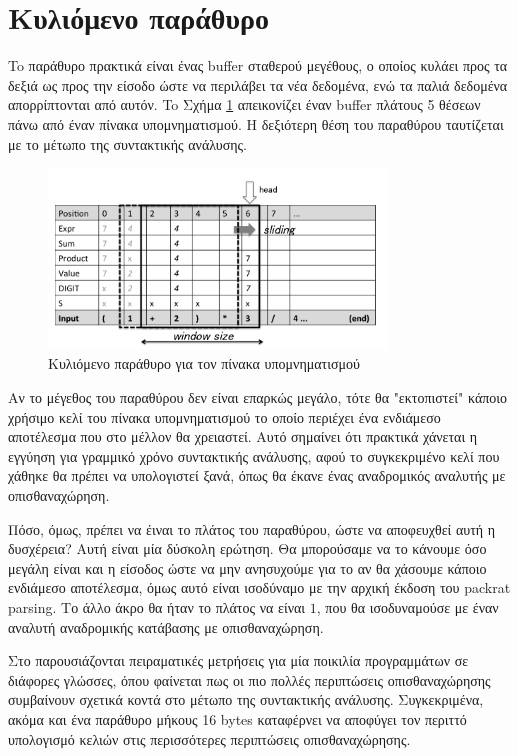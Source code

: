 \section{Κυλιόμενο παράθυρο}

To παράθυρο πρακτικά είναι ένας buffer σταθερού μεγέθους, ο οποίος κυλάει προς τα δεξιά ως προς την είσοδο ώστε να περιλάβει τα νέα δεδομένα, ενώ τα παλιά δεδομένα απορρίπτονται από αυτόν. 
To Σχήμα \ref{fig:slide_window} απεικονίζει έναν buffer πλάτους 5 θέσεων πάνω από έναν πίνακα υπομνηματισμού.
Η δεξιότερη θέση του παραθύρου ταυτίζεται με το μέτωπο της συντακτικής ανάλυσης.

\begin{figure}[h]
	\centering
	\includegraphics[width=0.8\textwidth]{pics/slide_window} 
	\caption{Κυλιόμενο παράθυρο για τον πίνακα υπομνηματισμού \cite{Kuramitsu2015a}}
	\label{fig:slide_window}
\end{figure}

Αν το μέγεθος του παραθύρου δεν είναι επαρκώς μεγάλο, τότε θα "εκτοπιστεί" κάποιο χρήσιμο κελί του πίνακα υπομνηματισμού το οποίο περιέχει ένα ενδιάμεσο αποτέλεσμα που στο μέλλον θα χρειαστεί.
Αυτό σημαίνει ότι πρακτικά χάνεται η εγγύηση για γραμμικό χρόνο συντακτικής ανάλυσης, αφού το συγκεκριμένο κελί που χάθηκε θα πρέπει να υπολογιστεί ξανά, όπως θα έκανε ένας αναδρομικός αναλυτής με οπισθαναχώρηση.

Πόσο, όμως, πρέπει να έιναι το πλάτος του παραθύρου, ώστε να αποφευχθεί αυτή η δυσχέρεια?
Αυτή είναι μία δύσκολη ερώτηση. 
Θα μπορούσαμε να το κάνουμε όσο μεγάλη είναι και η είσοδος ώστε να μην ανησυχούμε για το αν θα χάσουμε κάποιο ενδιάμεσο αποτέλεσμα, όμως αυτό είναι ισοδύναμο με την αρχική έκδοση του packrat parsing.
Το άλλο άκρο θα ήταν το πλάτος να είναι $1$, που θα ισοδυναμούσε με έναν αναλυτή αναδρομικής κατάβασης με οπισθαναχώρηση.

Στο \cite{Kuramitsu2015a} παρουσιάζονται πειραματικές μετρήσεις για μία ποικιλία προγραμμάτων σε διάφορες γλώσσες, όπου φαίνεται πως οι πιο πολλές περιπτώσεις οπισθαναχώρησης συμβαίνουν σχετικά κοντά στο μέτωπο της συντακτικής ανάλυσης.
Συγκεκριμένα, ακόμα και ένα παράθυρο μήκους 16 bytes καταφέρνει να αποφύγει τον περιττό υπολογισμό κελιών στις περισσότερες περιπτώσεις οπισθαναχώρησης.

